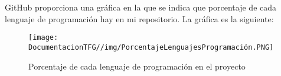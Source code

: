 GitHub proporciona una gráfica en la que se indica que porcentaje de cada lenguaje de programación hay en mi repositorio. La gráfica es la siguiente:

\begin{figure}[H]
    \centering
    \texttt{[image: DocumentacionTFG//img/PorcentajeLenguajesProgramación.PNG]}
    \caption{Porcentaje de cada lenguaje de programación en el proyecto}
    \label{fig:enter-label}
\end{figure}